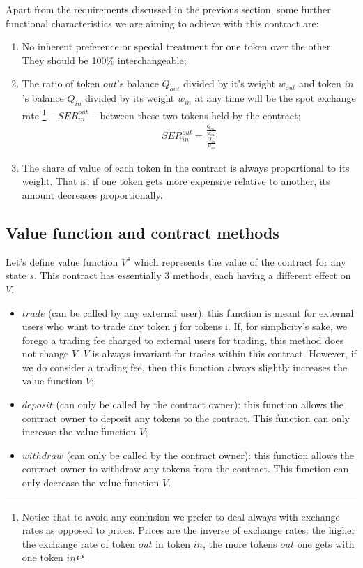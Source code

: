 \documentclass[11pt]{amsart}
\begin{document}
Apart from the requirements discussed in the previous section, some further functional characteristics we are aiming to achieve with this contract are:

\begin{enumerate}
    \item No inherent preference or special treatment for one token over the other. They should be 100\% interchangeable;
    \item The ratio of token $out$'s balance $Q_{out}$ divided by it's weight $w_{out}$ and token $in$'s balance $Q_{in}$ divided by its weight $w_{in}$ at any time will be the spot exchange rate \footnote{Notice that to avoid any confusion we prefer to deal always with exchange rates as opposed to prices. Prices are the inverse of exchange rates: the higher the exchange rate of token $out$ in token $in$, the more tokens $out$ one gets with one token $in$} -- $SER^{out}_{in}$ -- between these two tokens held by the contract;
\begin{align*}
SER^{out}_{in} = \frac{\frac{Q_{out}}{w_{out}}}{\frac{Q_{in}}{w_{in}}} \end{align*}
    
    \item The share of value of each token in the contract is always proportional to its weight. That is, if one token gets more expensive relative to another, its amount decreases proportionally. 
\end{enumerate}

\subsection{Value function and contract methods}
Let's define value function $V^s$ which represents the value of the contract for any state $s$. This contract has essentially 3 methods, each having a different effect on $V$.

\begin{itemize}
    \item $trade$ (can be called by any external user): this function is meant for external users who want to trade any token j for tokens i. If, for simplicity's sake, we forego a trading fee charged to external users for trading, this method does not change $V$. $V$ is always invariant for trades within this contract. However, if we do consider a trading fee, then this function always slightly increases the value function $V$;
    \item $deposit$ (can only be called by the contract owner): this function allows the contract owner to deposit any tokens to the contract. This function can only increase the value function $V$;
    \item $withdraw$ (can only be called by the contract owner): this function allows the contract owner to withdraw any tokens from the contract. This function can only decrease the value function $V$.
    

\end{itemize}
\end{document}
